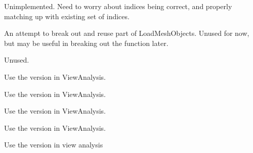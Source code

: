 \begin{DoxyRefList}
%
 Unimplemented. Need to worry about indices being correct, and properly matching up with existing set of indices. 
\item[Member \mbox{\hyperlink{a00280_a0248bddcdfb74e0e4105becff50e03ed}{HF\+::Geometry\+::Index\+Shape}} (const tinyobj\+::shape\+\_\+t \&shape, const vector$<$ tinyobj\+::real\+\_\+t $>$ \&verts, vector$<$ int $>$ out\+\_\+indices, vector$<$ float $>$ out\+\_\+vertexes)]\label{a00263__deprecated000007}%
%
An attempt to break out and reuse part of Load\+Mesh\+Objects. Unused for now, but may be useful in breaking out the function later.  
\item[Member \mbox{\hyperlink{a00277_ad36c0e67c4b26522c82d29a2f4c2e7e7}{HF\+::Ray\+Tracer\+::Calculate\+Hit\+Point}} (const P \&origin, const D \&direction, float distance)]\label{a00263__deprecated000008}%
%
Unused.  
\item[Member \mbox{\hyperlink{a00277_adb85d3abbe51075a71812fdc95de8322}{HF\+::Ray\+Tracer\+::get\+Random\+Number}} ()]\label{a00263__deprecated000009}%
%
Use the version in View\+Analysis.  
\item[Member \mbox{\hyperlink{a00277_a0429e7d02ef59bcad3fa5f7ec2b620dc}{HF\+::Ray\+Tracer\+::myradians}} (float angle)]\label{a00263__deprecated000010}%
%
Use the version in View\+Analysis.  
\item[Member \mbox{\hyperlink{a00277_af350b924e9637d84c8b316a3b1641bbc}{HF\+::Ray\+Tracer\+::mix}} (unsigned long a, unsigned long b, unsigned long c)]\label{a00263__deprecated000011}%
%
Use the version in View\+Analysis.  
\item[Member \mbox{\hyperlink{a00277_a03d93804b73bd4a5d8ab8e679e5b28cd}{HF\+::Ray\+Tracer\+::gen\+Sphere\+Rays}} (int step)]\label{a00263__deprecated000012}%
%
Use the version in View\+Analysis.  
\item[Member \mbox{\hyperlink{a00277_a6df9ff0fb8610752d548354b3e6600e0}{HF\+::Ray\+Tracer\+::gen\+Fibbonacci\+Rays}} (int numrays)]\label{a00263__deprecated000013}%
%
Use the version in view analysis  
\item[Member \mbox{\hyperlink{a00277_a03d93804b73bd4a5d8ab8e679e5b28cd}{HF\+::Ray\+Tracer\+::gen\+Sphere\+Rays}} (int step)]\label{a00263__deprecated000014}%
%

\end{DoxyRefList}
